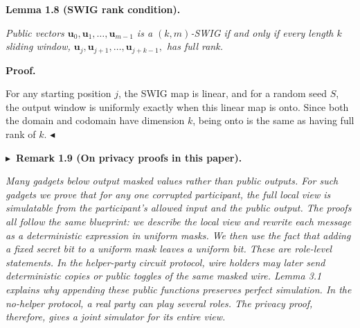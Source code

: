 

\par\medskip\noindent\textbf{
\textbf{Lemma 1.8}\textbf{ }(SWIG rank condition)\textbf{.}
}\par



\emph{Public vectors $\mathbf{u}_{0},\mathbf{u}_{1},\ldots,\mathbf{u}_{m-1}$ is a
$(k,m)$-SWIG if and only if every length $k$ sliding window,
$\mathbf{u}_{j},\mathbf{u}_{j+1},\ldots,\mathbf{u}_{j+k-1},$
has full rank.}\par






\par\medskip\noindent\textbf{Proof.}\par




For any starting position $j$, the SWIG map is linear, and for a random seed $S$, the output window is uniformly exactly when this linear map is onto. Since both the domain and
codomain have dimension $k$, being onto is the same as having full rank of $k$.
$\blacktriangleleft$\par





\par\medskip\noindent\textbf{
$\blacktriangleright$ Remark 1.9 (On privacy proofs in this paper).
}\par



\emph{Many gadgets below output masked values rather than public outputs. For such gadgets we prove that for any one corrupted participant, the full local view is simulatable from the participant’s allowed input and the public output. The proofs all follow the same blueprint: we describe the local view and rewrite each message as a deterministic expression in uniform masks. We then use the fact that adding a fixed secret bit to a uniform mask leaves a uniform bit. These are role-level statements. In the helper-party circuit protocol, wire holders may later send deterministic copies or public toggles of the same masked wire. Lemma 3.1 explains why appending these public functions preserves perfect simulation. In the no-helper protocol, a real party can play several roles. The privacy proof, therefore, gives a joint simulator for its entire view.}\par



